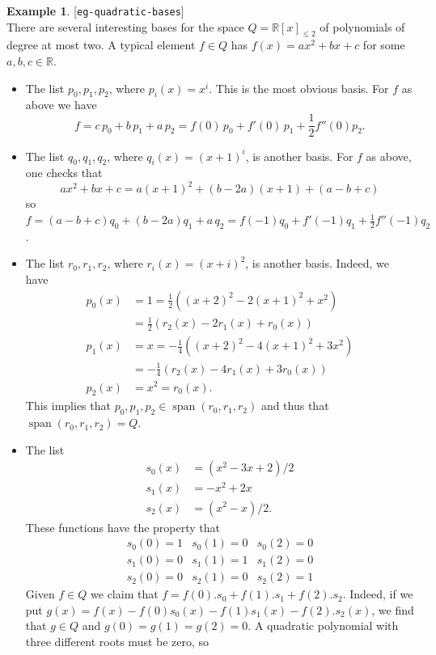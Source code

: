 \documentclass{amsart}
\newcommand{\lbl}[1]{\label{#1}\textup{[\texttt{#1}]}\ \\}
\newcommand{\lbl}{\label}
\newcommand{\R}         {{\mathbb{R}}}
\newcommand{\spn}       {\operatorname{span}}
\newcommand{\half}      {{\textstyle\frac{1}{2}}}
\renewcommand{\:}       {\colon}
\theoremstyle{definition}
\newtheorem{example}[theorem]{Example}
\begin{document}
\begin{example}\lbl{eg-quadratic-bases}
 There are several interesting bases for the space $Q=\R[x]_{\leq 2}$ of
 polynomials of degree at most two.  A typical element
 $f\in Q$ has $f(x)=ax^2+bx+c$ for some $a,b,c\in\R$.
 \begin{itemize}
  \item The list $p_0,p_1,p_2$, where $p_i(x)=x^i$.  This is the
   most obvious basis. For $f$ as above we have
   {\small \[ f = c\,p_0 + b\,p_1 + a\,p_2
        = f(0)\,p_0 + f'(0)\,p_1 + \half f''(0)p_2.
   \]}
  \item The list $q_0,q_1,q_2$, where $q_i(x)=(x+1)^i$, is
   another basis.  For $f$ as above, one checks that 
   \[ ax^2+bx+c = a(x+1)^2 + (b-2a)(x+1) + (a-b+c) \]
   so
   $f=(a-b+c)q_0+(b-2a)q_1+a\,q_2=f(-1)q_0+f'(-1)q_1+\half f''(-1)q_2$. 
  \item The list $r_0,r_1,r_2$, where $r_i(x)=(x+i)^2$, is
   another basis.  Indeed, we have 
   \begin{align*}
    p_0(x) &=1 = \half((x+2)^2-2(x+1)^2+x^2) \\
           &= \half(r_2(x)-2r_1(x)+r_0(x)) \\
    p_1(x) &=x = -\tfrac{1}{4}((x+2)^2-4(x+1)^2+3x^2) \\
           &= -\tfrac{1}{4}(r_2(x)-4r_1(x)+3r_0(x)) \\
    p_2(x) &=x^2 = r_0(x).
   \end{align*}
   This implies that $p_0,p_1,p_2\in\spn(r_0,r_1,r_2)$ and
   thus that $\spn(r_0,r_1,r_2)=Q$. 
  \item The list 
    \begin{align*}
      s_0(x) &= (x^2 - 3x + 2)/2 \\
      s_1(x) &= -x^2 + 2x \\
      s_2(x) &= (x^2 - x)/2.
    \end{align*}
    These functions have the property that
    \[ \begin{array}{ccc} 
        s_0(0) = 1 & s_0(1) = 0 & s_0(2) = 0 \\
        s_1(0) = 0 & s_1(1) = 1 & s_1(2) = 0 \\
        s_2(0) = 0 & s_2(1) = 0 & s_2(2) = 1
       \end{array}
    \]
    Given $f\in Q$ we claim that
    $f=f(0).s_0+f(1).s_1+f(2).s_2$.  Indeed, if we put
    $g(x)=f(x)-f(0)s_0(x)-f(1)s_1(x)-f(2).s_2(x)$, we find
    that $g\in Q$ and $g(0)=g(1)=g(2)=0$.  A quadratic
    polynomial with three different roots must be zero, so

\end{itemize}
\end{example}
\end{document}
